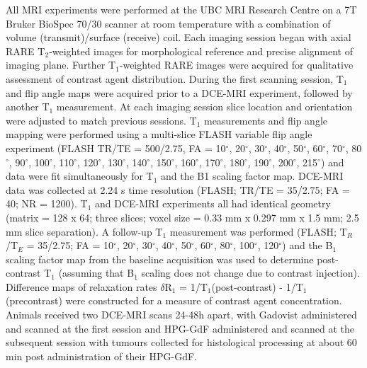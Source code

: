 All MRI experiments were performed at the UBC MRI Research Centre on a 7T Bruker BioSpec 70/30 scanner at room temperature with a combination of volume (transmit)/surface (receive) coil.
Each imaging session began with axial \acs{RARE} T$_2$-weighted images for morphological reference and precise alignment of imaging plane.
Further T$_1$-weighted \acs{RARE} images were acquired for qualitative assessment of contrast agent distribution.
During the first scanning session, T$_1$ and flip angle maps were acquired prior to a DCE-MRI experiment, followed by another T$_1$ measurement.
At each imaging session slice location and orientation were adjusted to match previous sessions.
T$_1$ measurements and flip angle mapping were performed using a multi-slice FLASH variable flip angle experiment (FLASH TR/TE = 500/2.75, FA = 10$^{\circ}$, 20$^{\circ}$, 30$^{\circ}$, 40$^{\circ}$, 50$^{\circ}$, 60$^{\circ}$, 70$^{\circ}$, 80$^{\circ}$, 90$^{\circ}$, 100$^{\circ}$, 110$^{\circ}$, 120$^{\circ}$, 130$^{\circ}$, 140$^{\circ}$, 150$^{\circ}$, 160$^{\circ}$, 170$^{\circ}$, 180$^{\circ}$, 190$^{\circ}$, 200$^{\circ}$, 215$^{\circ}$) and data were fit simultaneously for T$_1$ and the B1 scaling factor map.
\acs{DCE-MRI} data was collected at 2.24 s time resolution (FLASH; TR/TE = 35/2.75; FA = 40; NR = 1200).
T$_1$ and \acs{DCE-MRI} experiments all had identical geometry (matrix = 128 x 64; three slices; voxel size = 0.33 mm x 0.297 mm x 1.5 mm; 2.5 mm slice separation).
A follow-up T$_1$ measurement was performed (FLASH; T$_R$/T$_E$ = 35/2.75; FA = 10$^{\circ}$, 20$^{\circ}$, 30$^{\circ}$, 40$^{\circ}$, 50$^{\circ}$, 60$^{\circ}$, 80$^{\circ}$, 100$^{\circ}$, 120$^{\circ}$) and the B$_1$ scaling factor map from the baseline acquisition was used to determine post-contrast T$_1$ (assuming that B$_1$ scaling does not change due to contrast injection).
Difference maps of relaxation rates $\delta$R$_1$ = 1/T$_1$(post-contrast) - 1/T$_1$(precontrast) were constructed for a measure of contrast agent concentration.
Animals received two DCE-MRI scans 24-48h apart, with Gadovist administered and scanned at the first session and \acs{HPG-GdF} administered and scanned at the subsequent session with tumours collected for histological processing at about 60 min post administration of their \acs{HPG-GdF}.

